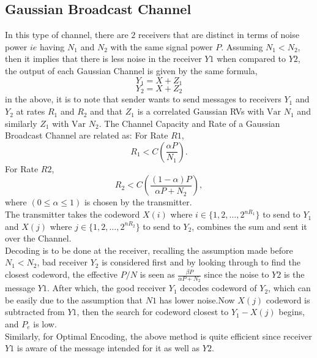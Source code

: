 \subsection{Gaussian Broadcast Channel}
In this type of channel, there are $2$ receivers that are distinct in terms of noise power $ie$ having \( N_1 \) and \( N_2 \) with the same signal power  \( P \). Assuming \( N_1 < N_2 \), then it implies that there is less noise in the receiver $Y1$ when compared to $Y2$, the output of each Gaussian Channel is given by the same formula,
\begin{equation}
Y_1 = X + Z_1  
\end{equation}
\begin{equation}
Y_2 = X + Z_2  
\end{equation}
in the above, it is to note that sender wants to send messages to receivers \( Y_1 \) and \( Y_2 \) at rates \( R_1 \) and \( R_2 \) and that  \( Z_1 \) is a correlated Gaussian RVs with $\mathrm{Var}$ \( N_1 \) and similarly  \( Z_1 \) with $\mathrm{Var}$ \( N_2 \).
The Channel Capacity and Rate of a Gaussian Broadcast Channel are related as:
For Rate $R1$,
\begin{equation}
R_1 < C \left( \frac{\alpha P}{N_1} \right).
\end{equation}
For Rate $R2$,
\begin{equation}
R_2 < C \left( \frac{(1 - \alpha)P}{\alpha P + N_2} \right),
\end{equation}
where \( (0 \leq \alpha \leq 1) \) is chosen by the transmitter.
\\
The transmitter takes the codeword \( X(i) \) where \( i \in \{1, 2, \ldots, 2^{n R_1}\} \) to send to \( Y_1 \) and \( X(j) \) where \( j \in \{1, 2, \ldots, 2^{n R_2}\} \) to send to \( Y_2 \), combines the sum and sent it over the Channel.
\\
Decoding is to be done at the receiver, recalling the assumption made before \( N_1 < N_2 \), bad receiver \( Y_2 \) is considered first and by looking through to find the closest codeword, the effective  \( P/N \) is seen as \( \frac{\beta P}{\alpha P + N_2} \) since the noise to $Y2$ is the message $Y1$.
After which, the good receiver \( Y_1 \) decodes codeword of \( Y_2 \), which can be easily due to the assumption that $N1$ has lower noise.Now \( X(j) \) codeword is subtracted from $Y1$, then the search for codeword closest to \( Y_1 - X(j) \) begins, and \( P_e\) is low.
\\
Similarly, for Optimal Encoding, the above method is quite efficient since receiver $Y1$ is aware of the message intended for it as well as $Y2$.

